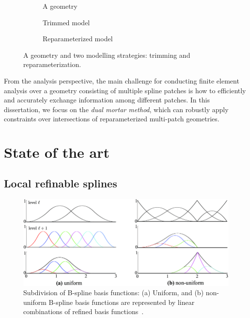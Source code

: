 \begin{figure}[ht]
	\captionsetup[subfigure]{labelformat=empty, font = footnotesize}
	\centering
	\begin{subfigure}[b]{0.32\textwidth}
		\centering
		
		\caption{A geometry}
	\end{subfigure}
	\begin{subfigure}[b]{0.32\textwidth}
		\centering
		
		\caption{Trimmed model}
	\end{subfigure}
	\begin{subfigure}[b]{0.32\textwidth}
		\centering
		
		\caption{Reparameterized model}
	\end{subfigure}
	\caption{A geometry and two modelling strategies: trimming and reparameterization.}
	\label{fig:geometries}
\end{figure}

From the analysis perspective, the main challenge for conducting finite element analysis over a geometry consisting of multiple spline patches is how to efficiently and accurately exchange information among different patches. In this dissertation, we focus on the \textit{dual mortar method}, which can robustly apply constraints over intersections of reparameterized multi-patch geometries.  

\section{State of the art}

\subsection{Local refinable splines}

\begin{figure}[h]
    \centering
    \includegraphics[width=.8\linewidth]{hierarchical-bsplines}
    \caption{Subdivision of B-spline basis functions: (a) Uniform, and (b) non-uniform B-spline basis functions are represented by linear combinations of refined basis functions~\cite{hennig2016bezier}.}\label{fig:hierarchical-bsplines}
\end{figure}

